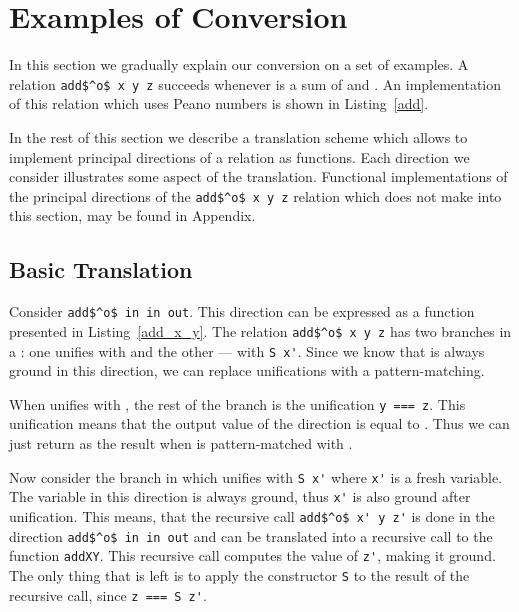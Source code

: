\section{Examples of Conversion}

In this section we gradually explain our conversion on a set of examples.
A relation \lstinline{add$^o$ x y z} succeeds whenever \z is a sum of \x and \y.
An implementation of this relation which uses Peano numbers is shown in Listing~\ref{add}.

% 


In the rest of this section we describe a translation scheme which allows to implement principal directions of a relation as functions.
Each direction we consider illustrates some aspect of the translation.
Functional implementations of the principal directions of the \lstinline{add$^o$ x y z} relation which does not make into this section, may be found in Appendix.

\subsection{Basic Translation}

Consider \lstinline{add$^o$ in in out}.
This direction can be expressed as a function presented in Listing~\ref{add_x_y}.
The relation \lstinline{add$^o$ x y z} has two branches in a \conde: one unifies \x with \zero and the other --- with \lstinline{S x'}.
Since we know that \x is always ground in this direction, we can replace unifications with a pattern-matching.

When \x unifies with \zero, the rest of the \conde branch is the unification \lstinline{y === z}.
This unification means that the output value of the direction is equal to \y.
Thus we can just return \y as the result when \x is pattern-matched with \zero.

Now consider the \conde branch in which \x unifies with \lstinline{S x'} where \lstinline{x'} is a fresh variable.
The variable \x in this direction is always ground, thus \lstinline{x'} is also ground after unification.
This means, that the recursive call \lstinline{add$^o$ x' y z'} is done in the direction \lstinline{add$^o$ in in out} and can be translated into a recursive call to the function \lstinline{addXY}.
This recursive call computes the value of \lstinline{z'}, making it ground.
The only thing that is left is to apply the constructor \lstinline{S} to the result of the recursive call, since \lstinline{z === S z'}.

